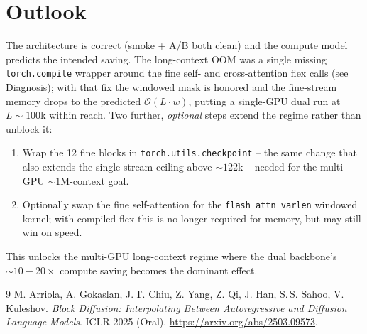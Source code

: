 \documentclass[11pt,a4paper]{article}
\begin{document}
\section{Outlook}

The architecture is correct (smoke + A/B both clean) and the compute model
predicts the intended saving. The long-context OOM was a single missing
\texttt{torch.compile} wrapper around the fine self- and cross-attention flex
calls (see Diagnosis); with that fix the windowed mask is honored and the
fine-stream memory drops to the predicted \(\mathcal{O}(L\!\cdot\!w)\), putting a
single-GPU dual run at \(L\!\sim\!100\)k within reach. Two further,
\emph{optional} steps extend the regime rather than unblock it:

\begin{enumerate}
  \item Wrap the 12 fine blocks in \texttt{torch.utils.checkpoint} -- the
        same change that also extends the single-stream ceiling above
        \(\sim\!122\)k -- needed for the multi-GPU \(\sim\!1\)M-context goal.
  \item Optionally swap the fine self-attention for the
        \texttt{flash\_attn\_varlen} windowed kernel; with compiled flex this is
        no longer required for memory, but may still win on speed.
\end{enumerate}

This unlocks the multi-GPU long-context regime where the dual backbone's
\(\sim\!10\!-\!20\times\) compute saving becomes the dominant effect.

\begin{thebibliography}{9}
M. Arriola, A. Gokaslan, J.\,T. Chiu, Z. Yang, Z. Qi, J. Han,
S.\,S. Sahoo, V. Kuleshov.
\emph{Block Diffusion: Interpolating Between Autoregressive and Diffusion
Language Models}. ICLR 2025 (Oral).
\url{https://arxiv.org/abs/2503.09573}.
\end{thebibliography}
\end{document}
